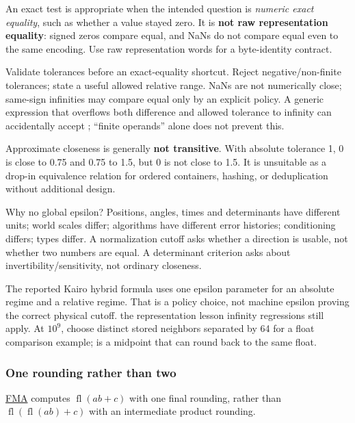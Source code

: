 An exact \BookInlineCode{==} test is appropriate when the intended question is \emph{numeric exact equality}, such as whether a value stayed zero. It is \textbf{not raw representation equality}: signed zeros compare equal, and NaNs do not compare equal even to the same encoding. Use raw representation words for a byte-identity contract.

Validate tolerances before an exact-equality shortcut. Reject negative/non-finite tolerances; state a useful allowed relative range. NaNs are not numerically close; same-sign infinities may compare equal only by an explicit policy. A generic expression that overflows both difference and allowed tolerance to infinity can accidentally accept ; ``finite operands'' alone does not prevent this.

Approximate closeness is generally \textbf{not transitive}. With absolute tolerance 1, 0 is close to 0.75 and 0.75 to 1.5, but 0 is not close to 1.5. It is unsuitable as a drop-in equivalence relation for ordered containers, hashing, or deduplication without additional design.

Why no global epsilon? Positions, angles, times and determinants have different units; world scales differ; algorithms have different error histories; conditioning differs; types differ. A normalization cutoff asks whether a direction is usable, not whether two numbers are equal. A determinant criterion asks about invertibility/sensitivity, not ordinary closeness.

The reported Kairo hybrid formula uses one epsilon parameter for an absolute regime and a relative regime. That is a policy choice, not machine epsilon proving the correct physical cutoff. the representation lesson infinity regressions still apply. At \(10^9\), choose distinct stored neighbors separated by 64 for a float comparison example;  is a midpoint that can round back to the same float.

\subsubsection{One rounding rather than two}\label{01-foundations-i-ch001-one-rounding-rather-than-two}

\hypertarget{01-foundations-i-ch001-one-rounding-rather-than-two}{}

\hyperref[appendix-41e8ef22a21e]{FMA} computes \(\operatorname{fl}(ab+c)\) with one final rounding, rather than \(\operatorname{fl}(\operatorname{fl}(ab)+c)\) with an intermediate product rounding.

